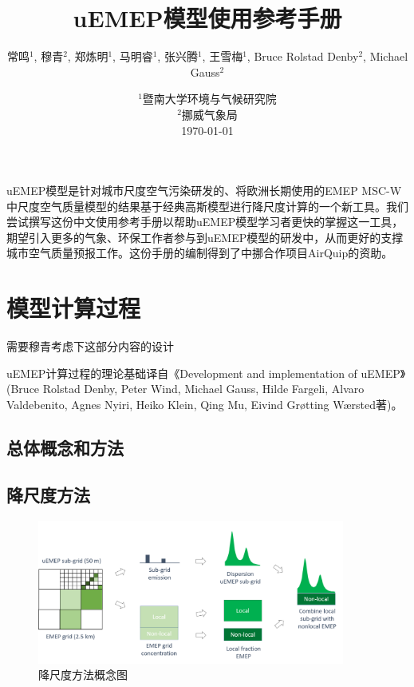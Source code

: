\documentclass{article}
\title{uEMEP模型使用参考手册}
\author{常鸣$^1$, 穆青$^2$, 郑炼明$^1$, 马明睿$^1$, 张兴腾$^1$, 王雪梅$^1$, Bruce Rolstad Denby$^2$, Michael Gauss$^2$}
\date{%
      $^1$暨南大学环境与气候研究院\\%
      $^2$挪威气象局\\[2ex]%
      \today
     }
\begin{document}
\maketitle


uEMEP模型是针对城市尺度空气污染研发的、将欧洲长期使用的EMEP MSC-W中尺度空气质量模型的结果基于经典高斯模型进行降尺度计算的一个新工具。我们尝试撰写这份中文使用参考手册以帮助uEMEP模型学习者更快的掌握这一工具，期望引入更多的气象、环保工作者参与到uEMEP模型的研发中，从而更好的支撑城市空气质量预报工作。这份手册的编制得到了中挪合作项目AirQuip的资助。

\tableofcontents
\newpage

\section{模型计算过程}

{\color{red} 需要穆青考虑下这部分内容的设计}

uEMEP计算过程的理论基础译自《Development and implementation of uEMEP》(Bruce Rolstad Denby, Peter Wind, Michael Gauss, Hilde Fargeli, Alvaro Valdebenito, Agnes Nyiri, Heiko Klein, Qing Mu, Eivind Grøtting Wærsted著)。

\subsection{总体概念和方法}

\subsection{降尺度方法}

\begin{figure}[H]
\includegraphics[width=0.9\textwidth]{fig11.png}
\centering\caption{降尺度方法概念图}\label{fig11}
\end{figure}
\end{document}
